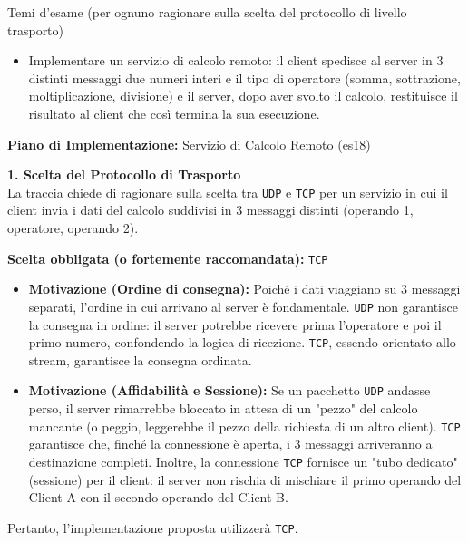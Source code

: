 \documentclass[11pt]{article}
\begin{document}
\begin{tcolorbox}[colback=blue!5!white,colframe=blue!75!black,title=\textbf{DOMANDA}, breakable]
Temi d'esame (per ognuno ragionare sulla scelta del protocollo di livello trasporto)
\begin{itemize}
    \item Implementare un servizio di calcolo remoto: il client spedisce al server in 3 distinti messaggi due numeri interi e il tipo di operatore (somma, sottrazione, moltiplicazione, divisione) e il server, dopo aver svolto il calcolo, restituisce il risultato al client che così termina la sua esecuzione.
\end{itemize}
\end{tcolorbox}

\begin{tcolorbox}[colback=green!5!white,colframe=green!75!black,title=\textbf{RISPOSTA}, breakable]
\textbf{Piano di Implementazione:} Servizio di Calcolo Remoto (es18)

\textbf{1. Scelta del Protocollo di Trasporto}\\
La traccia chiede di ragionare sulla scelta tra \texttt{UDP} e \texttt{TCP} per un servizio in cui il client invia i dati del calcolo suddivisi in 3 messaggi distinti (operando 1, operatore, operando 2).

\textbf{Scelta obbligata (o fortemente raccomandata):} \texttt{TCP}

\begin{itemize}
    \item \textbf{Motivazione (Ordine di consegna):} Poiché i dati viaggiano su 3 messaggi separati, l'ordine in cui arrivano al server è fondamentale. \texttt{UDP} non garantisce la consegna in ordine: il server potrebbe ricevere prima l'operatore e poi il primo numero, confondendo la logica di ricezione. \texttt{TCP}, essendo orientato allo stream, garantisce la consegna ordinata.
    \item \textbf{Motivazione (Affidabilità e Sessione):} Se un pacchetto \texttt{UDP} andasse perso, il server rimarrebbe bloccato in attesa di un "pezzo" del calcolo mancante (o peggio, leggerebbe il pezzo della richiesta di un altro client). \texttt{TCP} garantisce che, finché la connessione è aperta, i 3 messaggi arriveranno a destinazione completi. Inoltre, la connessione \texttt{TCP} fornisce un "tubo dedicato" (sessione) per il client: il server non rischia di mischiare il primo operando del Client A con il secondo operando del Client B.
\end{itemize}
Pertanto, l'implementazione proposta utilizzerà \texttt{TCP}.


\end{tcolorbox}
\end{document}
